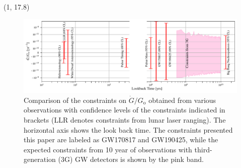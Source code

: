 \documentclass[a1,portrait]{a1poster}
\newcommand{\Go}{G_\mathrm{o}}
\begin{document}
\begin{textblock}{15}(1, 17.8)
	\begin{figure}[t]
		\centering
		\includegraphics[width=0.95\linewidth]{gdot_over_cosmic_time.pdf}
		\caption{Comparison of the constraints on $\dot{G}/\Go$ obtained from various observations with confidence levels of the constraints indicated in brackets (LLR denotes constraints from lunar laser ranging). The horizontal axis shows the look back time. The constraints presented this paper are labeled as GW170817 and GW190425, while the expected constraints from 10 year of observations with third-generation (3G) GW detectors is shown by the pink band.}
		\label{fig:gdot_plots}
	\end{figure}
\end{textblock}
\end{document}
